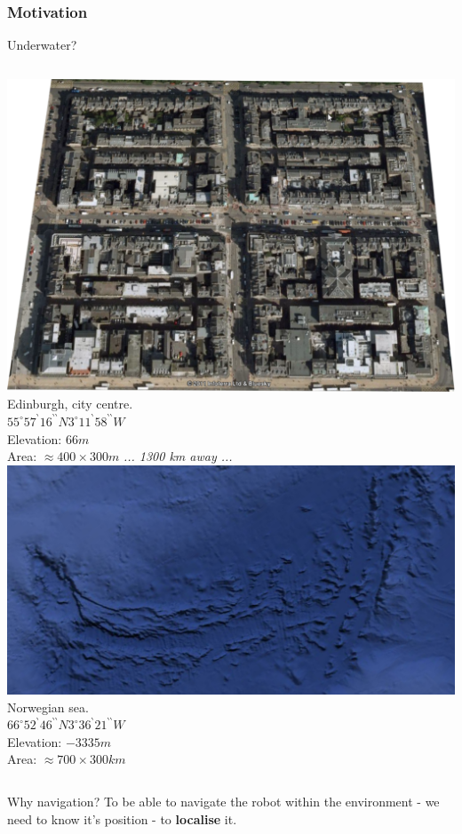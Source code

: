 \begin{frame} \frametitle{Motivation}
\begin{block} {Underwater?}
\begin{columns}
\centering
\includegraphics[width=0.8\linewidth]{fig/edinburgh.pdf} \\
Edinburgh, city centre. \\ 
$ 55^{\circ}57 ^{\backprime}16 ^{\backprime \backprime}  N  3^{\circ} 11 ^{\backprime} 58 ^{\backprime \backprime}  W $ \\
Elevation: $66 m$ \\
Area: $\approx 400 \times 300 m $
\textit{... 1300 km away ...}
\centering
\includegraphics[width=0.8\linewidth]{fig/norwegianSea.pdf} \\
Norwegian sea. \\
$ 66^{\circ}  52 ^{\backprime} 46 ^{\backprime \backprime} N  3^{\circ}  36 ^{\backprime}  21 ^{\backprime \backprime} W $ \\
Elevation: $-3335 m$ \\
Area: $ \approx 700 \times 300 km $
\end{columns}
\end{block}

\begin{block} {Why navigation?}
	To be able to navigate the robot within the environment - we need to know it's position - to \textbf{localise} it.
\end{block}
\end{frame}
